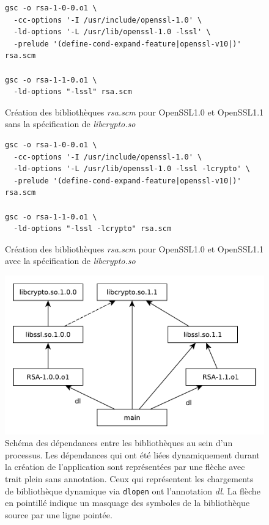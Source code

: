 \begin{center}
\begin{figure}[ht]
\begin{lstlisting}[frame=single]
gsc -o rsa-1-0-0.o1 \
  -cc-options '-I /usr/include/openssl-1.0' \
  -ld-options '-L /usr/lib/openssl-1.0 -lssl' \
  -prelude '(define-cond-expand-feature|openssl-v10|)' rsa.scm

gsc -o rsa-1-1-0.o1 \
  -ld-options "-lssl" rsa.scm
\end{lstlisting}
\caption{Création des bibliothèques \textit{rsa.scm} pour OpenSSL1.0 et OpenSSL1.1
sans la spécification de \textit{libcrypto.so}}
\label{fig:scm_masq1}
\end{figure}
\end{center}

\begin{center}
\begin{figure}[ht]
\begin{lstlisting}[frame=single]
gsc -o rsa-1-0-0.o1 \
  -cc-options '-I /usr/include/openssl-1.0' \
  -ld-options '-L /usr/lib/openssl-1.0 -lssl -lcrypto' \
  -prelude '(define-cond-expand-feature|openssl-v10|)' rsa.scm

gsc -o rsa-1-1-0.o1 \
  -ld-options "-lssl -lcrypto" rsa.scm
\end{lstlisting}
\caption{Création des bibliothèques \textit{rsa.scm} pour OpenSSL1.0 et OpenSSL1.1
avec la spécification de \textit{libcrypto.so}}
\label{fig:scm_masq_fix1}
\end{figure}
\end{center}

\begin{center}
\begin{figure}[ht]
\includegraphics{figures/libssl_masking.pdf}

\caption{Schéma des dépendances entre les bibliothèques au sein d'un
  processus.  Les dépendances qui ont été liées dynamiquement durant la création
  de l'application sont représentées par une flèche avec trait plein sans
  annotation. Ceux qui représentent les chargements de bibliothèque dynamique via
  \texttt{dlopen} ont l'annotation \textit{dl}. La flèche en pointillé indique
  un masquage des symboles de la bibliothèque source par une ligne pointée.}

\label{fig:scm_masq_schema}
\end{figure}
\end{center}


